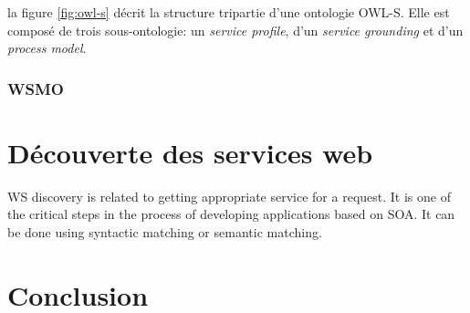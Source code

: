       la figure \ref{fig:owl-s} décrit la structure tripartie d'une
      ontologie \textsc{OWL-S}. Elle est composé de trois sous-ontologie: un
      \emph{service profile}, d'un \emph{service grounding} et d'un
      \emph{process model}.
      \subsubsection{WSMO}
      \cite{baryannis2010}
  \section{Découverte des services web}

  WS discovery is related to getting appropriate service for a
  request. It is one of the critical steps in the process of developing
  applications based on SOA. It can be done using syntactic matching or
  semantic matching\cite{Omer2011}.\\
  
  \section{Conclusion}

